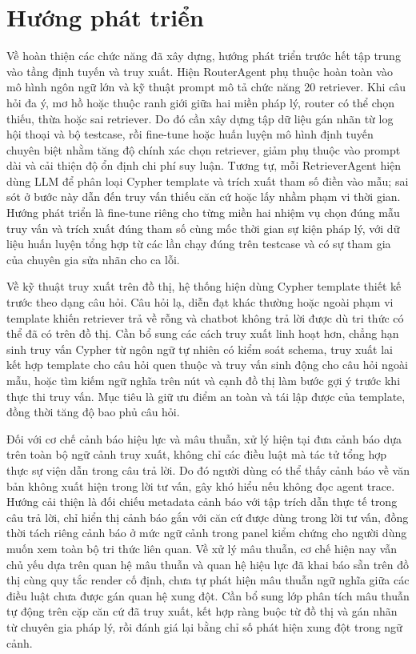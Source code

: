 \documentclass[../DoAn.tex]{subfiles}
\begin{document}
\section{Hướng phát triển}
\label{section:future-work}

Về hoàn thiện các chức năng đã xây dựng, hướng phát triển trước hết tập trung vào tầng định tuyến và truy xuất. Hiện RouterAgent phụ thuộc hoàn toàn vào mô hình ngôn ngữ lớn và kỹ thuật prompt mô tả chức năng 20 retriever. Khi câu hỏi đa ý, mơ hồ hoặc thuộc ranh giới giữa hai miền pháp lý, router có thể chọn thiếu, thừa hoặc sai retriever. Do đó cần xây dựng tập dữ liệu gán nhãn từ log hội thoại và bộ testcase, rồi fine-tune hoặc huấn luyện mô hình định tuyến chuyên biệt nhằm tăng độ chính xác chọn retriever, giảm phụ thuộc vào prompt dài và cải thiện độ ổn định chi phí suy luận. Tương tự, mỗi RetrieverAgent hiện dùng LLM để phân loại Cypher template và trích xuất tham số điền vào mẫu; sai sót ở bước này dẫn đến truy vấn thiếu căn cứ hoặc lấy nhầm phạm vi thời gian. Hướng phát triển là fine-tune riêng cho từng miền hai nhiệm vụ chọn đúng mẫu truy vấn và trích xuất đúng tham số cùng mốc thời gian sự kiện pháp lý, với dữ liệu huấn luyện tổng hợp từ các lần chạy đúng trên testcase và có sự tham gia của chuyên gia sửa nhãn cho ca lỗi.

Về kỹ thuật truy xuất trên đồ thị, hệ thống hiện dùng Cypher template thiết kế trước theo dạng câu hỏi. Câu hỏi lạ, diễn đạt khác thường hoặc ngoài phạm vi template khiến retriever trả về rỗng và chatbot không trả lời được dù tri thức có thể đã có trên đồ thị. Cần bổ sung các cách truy xuất linh hoạt hơn, chẳng hạn sinh truy vấn Cypher từ ngôn ngữ tự nhiên có kiểm soát schema, truy xuất lai kết hợp template cho câu hỏi quen thuộc và truy vấn sinh động cho câu hỏi ngoài mẫu, hoặc tìm kiếm ngữ nghĩa trên nút và cạnh đồ thị làm bước gợi ý trước khi thực thi truy vấn. Mục tiêu là giữ ưu điểm an toàn và tái lập được của template, đồng thời tăng độ bao phủ câu hỏi.

Đối với cơ chế cảnh báo hiệu lực và mâu thuẫn, xử lý hiện tại đưa cảnh báo dựa trên toàn bộ ngữ cảnh truy xuất, không chỉ các điều luật mà tác tử tổng hợp thực sự viện dẫn trong câu trả lời. Do đó người dùng có thể thấy cảnh báo về văn bản không xuất hiện trong lời tư vấn, gây khó hiểu nếu không đọc agent trace. Hướng cải thiện là đối chiếu metadata cảnh báo với tập trích dẫn thực tế trong câu trả lời, chỉ hiển thị cảnh báo gắn với căn cứ được dùng trong lời tư vấn, đồng thời tách riêng cảnh báo ở mức ngữ cảnh trong panel kiểm chứng cho người dùng muốn xem toàn bộ tri thức liên quan. Về xử lý mâu thuẫn, cơ chế hiện nay vẫn chủ yếu dựa trên quan hệ mâu thuẫn và quan hệ hiệu lực đã khai báo sẵn trên đồ thị cùng quy tắc render cố định, chưa tự phát hiện mâu thuẫn ngữ nghĩa giữa các điều luật chưa được gán quan hệ xung đột. Cần bổ sung lớp phân tích mâu thuẫn tự động trên cặp căn cứ đã truy xuất, kết hợp ràng buộc từ đồ thị và gán nhãn từ chuyên gia pháp lý, rồi đánh giá lại bằng chỉ số phát hiện xung đột trong ngữ cảnh.
\end{document}

